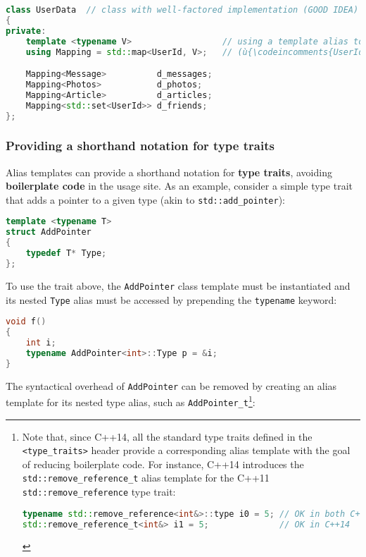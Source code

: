 \begin{lstlisting}[language=C++]
class UserData  // class with well-factored implementation (GOOD IDEA)
{
private:
    template <typename V>                  // using a template alias to bind
    using Mapping = std::map<UserId, V>;   // (ù{\codeincomments{UserId}}ù) as the key type

    Mapping<Message>          d_messages;
    Mapping<Photos>           d_photos;
    Mapping<Article>          d_articles;
    Mapping<std::set<UserId>> d_friends;
};
\end{lstlisting}
    

\subsubsection[Providing a shorthand notation for type traits]{Providing a shorthand notation for type traits}\label{providing-a-shorthand-notation-for-type-traits}

Alias templates can provide a shorthand notation for \textbf{type
traits}, avoiding \textbf{boilerplate code} in the usage site. As an
example, consider a simple type trait that adds a pointer to a given
type (akin to \texttt{std::add\_pointer}):

\begin{lstlisting}[language=C++]
template <typename T>
struct AddPointer
{
    typedef T* Type;
};
\end{lstlisting}
    
\noindent To use the trait above, the \texttt{AddPointer} class template
must be instantiated and its nested \texttt{Type} alias must be
accessed by prepending the \texttt{typename} keyword:

\begin{lstlisting}[language=C++]
void f()
{
    int i;
    typename AddPointer<int>::Type p = &i;
}
\end{lstlisting}
    
\noindent The syntactical overhead of \texttt{AddPointer} can be removed by
creating an alias template for its nested type alias, such as
\texttt{AddPointer\_t}{\cprotect\footnote{Note that, since C++14, all
the standard type traits defined in the \texttt{<type\_traits>} header
provide a corresponding alias template with the goal of reducing
boilerplate code. For instance, C++14 introduces the
\texttt{std::remove\_reference\_t} alias template for the C++11
\texttt{std::remove\_reference} type trait:

\begin{lstlisting}[language=C++, basicstyle={\ttfamily\footnotesize}]
typename std::remove_reference<int&>::type i0 = 5; // OK in both C++11 and C++14
std::remove_reference_t<int&> i1 = 5;              // OK in C++14
\end{lstlisting}
      }}:

